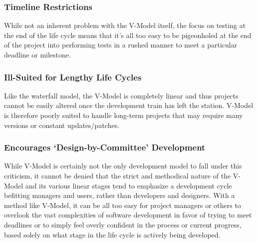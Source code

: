 \documentclass[main.tex]{subfiles}
\begin{document}
\subsubsection{Timeline Restrictions}
While not an inherent problem with the V-Model itself, the focus on testing at the end of the life cycle means that it’s all too easy to be pigeonholed at the end of the project into performing tests in a rushed manner to meet a particular deadline or milestone.

\subsubsection{Ill-Suited for Lengthy Life Cycles}
Like the waterfall model, the V-Model is completely linear and thus projects cannot be easily altered once the development train has left the station. V-Model is therefore poorly suited to handle long-term projects that may require many versions or constant updates/patches.

\subsubsection{Encourages ‘Design-by-Committee’ Development}
While V-Model is certainly not the only development model to fall under this criticism, it cannot be denied that the strict and methodical nature of the V-Model and its various linear stages tend to emphasize a development cycle befitting managers and users, rather than developers and designers. With a method like V-Model, it can be all too easy for project managers or others to overlook the vast complexities of software development in favor of trying to meet deadlines or to simply feel overly confident in the process or current progress, based solely on what stage in the life cycle is actively being developed.
\end{document}
